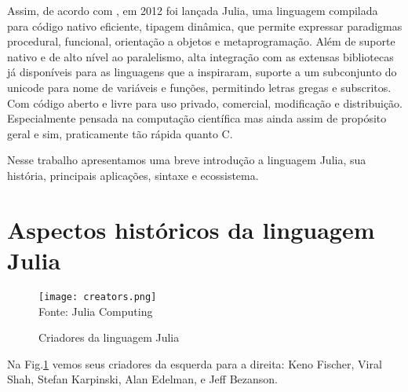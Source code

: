 Assim, de acordo com \cite{Bezanson2017}, em 2012 foi lançada Julia, uma linguagem compilada para código nativo eficiente, tipagem dinâmica, que permite expressar paradigmas procedural, funcional, orientação a objetos e metaprogramação.  Além de suporte nativo e de alto nível ao paralelismo, alta integração com as extensas bibliotecas já disponíveis para as linguagens que a inspiraram, suporte a um subconjunto do unicode para nome de variáveis e funções, permitindo letras gregas e subscritos. 
Com código aberto e livre para uso privado, comercial, modificação e distribuição.
Especialmente pensada na computação científica mas ainda assim de propósito geral e sim, praticamente tão rápida quanto C. \cite{Lobianco2019,Bezanson2017}

 Nesse trabalho apresentamos uma breve introdução a linguagem Julia, sua história, principais aplicações, sintaxe e ecossistema. 





\newpage
\section{Aspectos históricos da linguagem Julia}

\begin{figure}[H]
   \begin{center}
       \caption{Criadores da linguagem Julia} \label{criadores}
       \texttt{[image: creators.png]} \\
       {\tiny \sf Fonte: Julia Computing}
   \end{center}
  \end{figure}

Na Fig.\ref{criadores} vemos seus criadores da esquerda para a direita: Keno Fischer, Viral Shah, Stefan Karpinski, Alan Edelman, e Jeff Bezanson.
\newline

